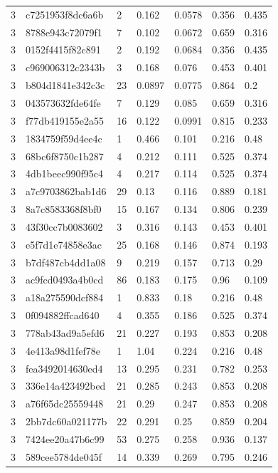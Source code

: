 \begin{tabular}{lllllll}
3 & c7251953f8dc6a6b & 2 & 0.162 & 0.0578 & 0.356 & 0.435 \\
3 & 8788e943c72079f1 & 7 & 0.102 & 0.0672 & 0.659 & 0.316 \\
3 & 0152f4415f82c891 & 2 & 0.192 & 0.0684 & 0.356 & 0.435 \\
3 & c969006312c2343b & 3 & 0.168 & 0.076 & 0.453 & 0.401 \\
3 & b804d1841e342c3c & 23 & 0.0897 & 0.0775 & 0.864 & 0.2 \\
3 & 043573632fde64fe & 7 & 0.129 & 0.085 & 0.659 & 0.316 \\
3 & f77db419155e2a55 & 16 & 0.122 & 0.0991 & 0.815 & 0.233 \\
3 & 1834759f59d4ee4c & 1 & 0.466 & 0.101 & 0.216 & 0.48 \\
3 & 68bc6f8750c1b287 & 4 & 0.212 & 0.111 & 0.525 & 0.374 \\
3 & 4db1beec990f95c4 & 4 & 0.217 & 0.114 & 0.525 & 0.374 \\
3 & a7c9703862bab1d6 & 29 & 0.13 & 0.116 & 0.889 & 0.181 \\
3 & 8a7c8583368f8bf0 & 15 & 0.167 & 0.134 & 0.806 & 0.239 \\
3 & 43f30cc7b0083602 & 3 & 0.316 & 0.143 & 0.453 & 0.401 \\
3 & e5f7d1e74858e3ac & 25 & 0.168 & 0.146 & 0.874 & 0.193 \\
3 & b7df487cb4dd1a08 & 9 & 0.219 & 0.157 & 0.713 & 0.29 \\
3 & ac9fcd0493a4b0cd & 86 & 0.183 & 0.175 & 0.96 & 0.109 \\
3 & a18a275590dcf884 & 1 & 0.833 & 0.18 & 0.216 & 0.48 \\
3 & 0f094882ffcad640 & 4 & 0.355 & 0.186 & 0.525 & 0.374 \\
3 & 778ab43ad9a5efd6 & 21 & 0.227 & 0.193 & 0.853 & 0.208 \\
3 & 4e413a98d1fef78e & 1 & 1.04 & 0.224 & 0.216 & 0.48 \\
3 & fea3492014630ed4 & 13 & 0.295 & 0.231 & 0.782 & 0.253 \\
3 & 336e14a423492bed & 21 & 0.285 & 0.243 & 0.853 & 0.208 \\
3 & a76f65dc25559448 & 21 & 0.29 & 0.247 & 0.853 & 0.208 \\
3 & 2bb7dc60a021177b & 22 & 0.291 & 0.25 & 0.859 & 0.204 \\
3 & 7424ee20a47b6c99 & 53 & 0.275 & 0.258 & 0.936 & 0.137 \\
3 & 589cee5784de045f & 14 & 0.339 & 0.269 & 0.795 & 0.246 \\

\end{tabular}
